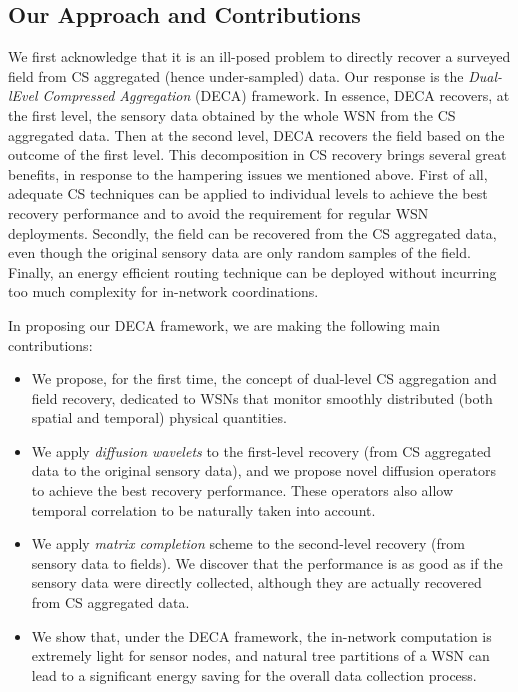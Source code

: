 \documentclass[conference]{IEEEtran}
\begin{document}
  \subsection{Our Approach and Contributions}
We first acknowledge that it is an ill-posed problem to directly recover a surveyed field from CS aggregated (hence under-sampled) data. Our response is the \textit{Dual-lEvel Compressed Aggregation} (DECA) framework. In essence, DECA recovers, at the first level, the sensory data obtained by the whole WSN from the CS aggregated data. Then at the second level, DECA recovers the field based on the outcome of the first level. This decomposition in CS recovery brings several great benefits, in response to the hampering issues we mentioned above. First of all, adequate CS techniques can be applied to individual levels to achieve the best recovery performance and to avoid the requirement for regular WSN deployments. Secondly, the field can be recovered from the CS aggregated data, even though the original sensory data are only random samples of the field. Finally, an energy efficient routing technique can be deployed without incurring too much complexity for in-network coordinations.

    In proposing our DECA framework, we are making the following main contributions:
\begin{itemize}
\item We propose, for the first time, the concept of dual-level CS aggregation and field recovery, dedicated to WSNs that monitor smoothly distributed (both spatial and temporal) physical quantities.
      \item We apply \textit{diffusion wavelets} to the first-level recovery (from CS aggregated data to the original sensory data), and we propose novel diffusion operators to achieve the best recovery performance. These operators also allow temporal correlation to be naturally taken into account.
      \item We apply \textit{matrix completion} scheme to the second-level recovery (from sensory data to fields). We discover that the performance is as good as if the sensory data were directly collected, although they are actually recovered from CS aggregated data.
      \item We show that, under the DECA framework, the in-network computation is extremely light for sensor nodes, and natural tree partitions of a WSN can lead to a significant energy saving for the overall data collection process.
    \end{itemize}
\end{document}
